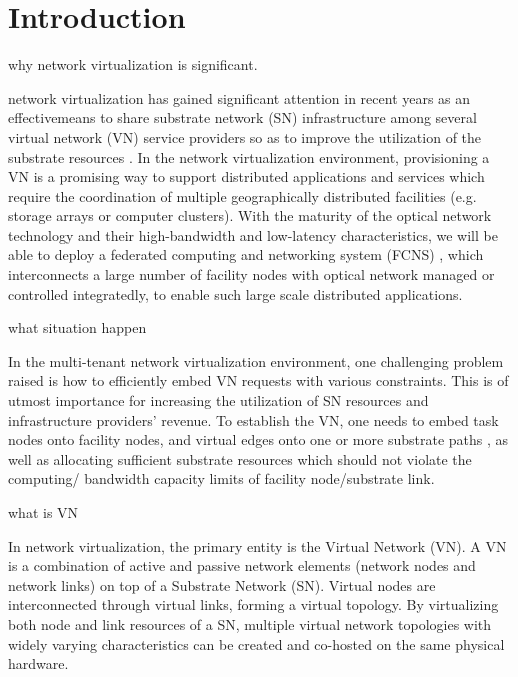 
\section{Introduction}
why network virtualization is significant.

network virtualization has gained significant attention in recent years as an effectivemeans to share substrate network (SN) infrastructure among several virtual network (VN) service providers so as to improve the utilization of the substrate resources \cite{armbrust2009above,yu2008rethinking}. In the network virtualization environment, provisioning a VN is a promising way to support distributed applications and services which require the coordination of multiple geographically distributed facilities (e.g. storage arrays or computer clusters). With the maturity of the optical network technology and their high-bandwidth and low-latency characteristics, we will be able to deploy a federated computing and networking system (FCNS) \cite{zhang2013effective,papagianni2013optimal}, which interconnects a large number of facility nodes with optical network managed or controlled integratedly, to enable such large scale distributed applications.

what situation happen

In the multi-tenant network virtualization environment, one challenging problem raised is how to efficiently embed VN requests with various constraints. This is of utmost importance for increasing the utilization of SN resources and infrastructure providers’ revenue. To establish the VN, one needs to embed task nodes onto facility nodes, and virtual edges onto one or more substrate paths\cite{yu2008rethinking} , as well as allocating sufficient substrate resources which should not violate the computing/ bandwidth capacity limits of facility node/substrate link.

what is VN

In network virtualization, the primary entity is the Virtual Network (VN). A VN is a combination of active and passive network elements (network nodes and network links) on top of a Substrate Network (SN). Virtual nodes are interconnected through virtual links, forming a virtual topology. By virtualizing both node and link resources of a SN, multiple virtual network topologies with widely varying characteristics can be created and co-hosted on the same physical hardware.



